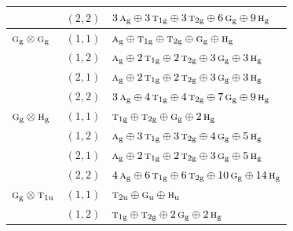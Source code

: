 \documentclass[11pt]{article}
\newcommand{\irr}[1]{\text{\normalfont\scshape #1}}
\newcommand{\ptag}[1]{\mathrm{#1}}
\begin{document}
\begin{longtable}{p{} c p{}}
 & $(2,2)$ & $3\,\irr{a}_{\ptag{g}}\oplus 3\,\irr{t}_{1\ptag{g}}\oplus 3\,\irr{t}_{2\ptag{g}}\oplus 6\,\irr{g}_{\ptag{g}}\oplus 9\,\irr{h}_{\ptag{g}}$\\

\hline

$\irr{g}_{\ptag{g}}\otimes \irr{g}_{\ptag{g}}$ & $(1,1)$ & $\irr{a}_{\ptag{g}}\oplus \irr{t}_{1\ptag{g}}\oplus \irr{t}_{2\ptag{g}}\oplus \irr{g}_{\ptag{g}}\oplus \irr{h}_{\ptag{g}}$\\

 & $(1,2)$ & $\irr{a}_{\ptag{g}}\oplus 2\,\irr{t}_{1\ptag{g}}\oplus 2\,\irr{t}_{2\ptag{g}}\oplus 3\,\irr{g}_{\ptag{g}}\oplus 3\,\irr{h}_{\ptag{g}}$\\

 & $(2,1)$ & $\irr{a}_{\ptag{g}}\oplus 2\,\irr{t}_{1\ptag{g}}\oplus 2\,\irr{t}_{2\ptag{g}}\oplus 3\,\irr{g}_{\ptag{g}}\oplus 3\,\irr{h}_{\ptag{g}}$\\

 & $(2,2)$ & $3\,\irr{a}_{\ptag{g}}\oplus 4\,\irr{t}_{1\ptag{g}}\oplus 4\,\irr{t}_{2\ptag{g}}\oplus 7\,\irr{g}_{\ptag{g}}\oplus 9\,\irr{h}_{\ptag{g}}$\\

\hline

$\irr{g}_{\ptag{g}}\otimes \irr{h}_{\ptag{g}}$ & $(1,1)$ & $\irr{t}_{1\ptag{g}}\oplus \irr{t}_{2\ptag{g}}\oplus \irr{g}_{\ptag{g}}\oplus 2\,\irr{h}_{\ptag{g}}$\\

 & $(1,2)$ & $\irr{a}_{\ptag{g}}\oplus 3\,\irr{t}_{1\ptag{g}}\oplus 3\,\irr{t}_{2\ptag{g}}\oplus 4\,\irr{g}_{\ptag{g}}\oplus 5\,\irr{h}_{\ptag{g}}$\\

 & $(2,1)$ & $\irr{a}_{\ptag{g}}\oplus 2\,\irr{t}_{1\ptag{g}}\oplus 2\,\irr{t}_{2\ptag{g}}\oplus 3\,\irr{g}_{\ptag{g}}\oplus 5\,\irr{h}_{\ptag{g}}$\\

 & $(2,2)$ & $4\,\irr{a}_{\ptag{g}}\oplus 6\,\irr{t}_{1\ptag{g}}\oplus 6\,\irr{t}_{2\ptag{g}}\oplus 10\,\irr{g}_{\ptag{g}}\oplus 14\,\irr{h}_{\ptag{g}}$\\

\hline

$\irr{g}_{\ptag{g}}\otimes \irr{t}_{1\ptag{u}}$ & $(1,1)$ & $\irr{t}_{2\ptag{u}}\oplus \irr{g}_{\ptag{u}}\oplus \irr{h}_{\ptag{u}}$\\

 & $(1,2)$ & $\irr{t}_{1\ptag{g}}\oplus \irr{t}_{2\ptag{g}}\oplus 2\,\irr{g}_{\ptag{g}}\oplus 2\,\irr{h}_{\ptag{g}}$\\


\end{longtable}
\end{document}
